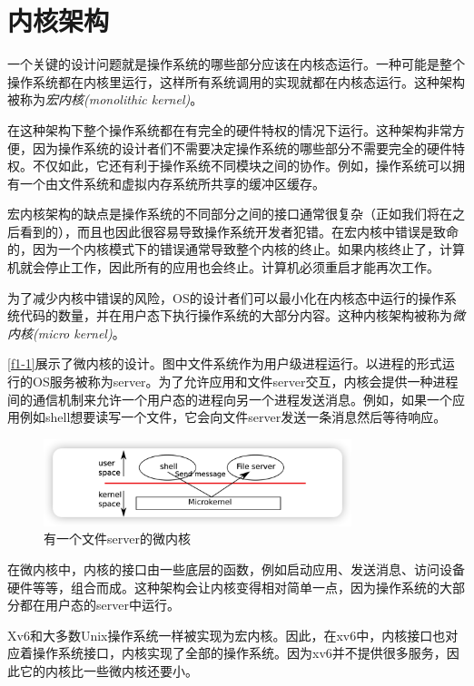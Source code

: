 \section*{内核架构}
一个关键的设计问题就是操作系统的哪些部分应该在内核态运行。一种可能是整个操作系统都在内核里运行，这样所有系统调用的实现就都在内核态运行。这种架构被称为\emph{宏内核(monolithic kernel)}。

在这种架构下整个操作系统都在有完全的硬件特权的情况下运行。这种架构非常方便，因为操作系统的设计者们不需要决定操作系统的哪些部分不需要完全的硬件特权。不仅如此，它还有利于操作系统不同模块之间的协作。例如，操作系统可以拥有一个由文件系统和虚拟内存系统所共享的缓冲区缓存。

宏内核架构的缺点是操作系统的不同部分之间的接口通常很复杂（正如我们将在之后看到的），而且也因此很容易导致操作系统开发者犯错。在宏内核中错误是致命的，因为一个内核模式下的错误通常导致整个内核的终止。如果内核终止了，计算机就会停止工作，因此所有的应用也会终止。计算机必须重启才能再次工作。

为了减少内核中错误的风险，OS的设计者们可以最小化在内核态中运行的操作系统代码的数量，并在用户态下执行操作系统的大部分内容。这种内核架构被称为\emph{微内核(micro kernel)}。

\autoref{f1-1}展示了微内核的设计。图中文件系统作为用户级进程运行。以进程的形式运行的OS服务被称为server。为了允许应用和文件server交互，内核会提供一种进程间的通信机制来允许一个用户态的进程向另一个进程发送消息。例如，如果一个应用例如shell想要读写一个文件，它会向文件server发送一条消息然后等待响应。

\begin{figure}[htbp]
    \centering
    \includegraphics[width=0.8\textwidth]{../imgs/f1-1.png}
    \caption{有一个文件server的微内核}
    \label{f1-1}
\end{figure}

在微内核中，内核的接口由一些底层的函数，例如启动应用、发送消息、访问设备硬件等等，组合而成。这种架构会让内核变得相对简单一点，因为操作系统的大部分都在用户态的server中运行。

Xv6和大多数Unix操作系统一样被实现为宏内核。因此，在xv6中，内核接口也对应着操作系统接口，内核实现了全部的操作系统。因为xv6并不提供很多服务，因此它的内核比一些微内核还要小。


